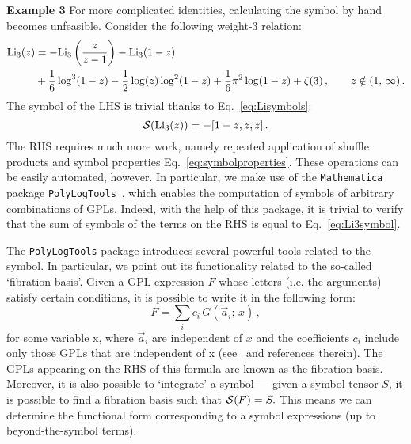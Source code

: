 \documentclass[main.tex]{subfiles}
\begin{document}
\textbf{Example 3}
\newline
{}
For more complicated identities, calculating the symbol by hand becomes unfeasible. Consider the following weight-3 relation:
\begin{align}
    \text{Li}_3(z)&=-\text{Li}_3\left(\frac{z}{z-1}\right)-\text{Li}_3(1-z) \nonumber \\
    &+\frac{1}{6} \log ^3(1-z)-\frac{1}{2} \log (z) \log ^2(1-z)+\frac{1}{6} \pi ^2 \log (1-z)+\zeta (3)\,, \qquad z \notin (1, \, \infty)\,.
\end{align}
The symbol of the LHS is trivial thanks to Eq.~\ref{eq:Lisymbols}:
\begin{equation} \label{eq:Li3symbol}
    \mathcal{S}(\text{Li}_3(z)) = -[1-z,z,z]\,.
\end{equation}
The RHS requires much more work, namely repeated application of shuffle products and symbol properties Eq.~\ref{eq:symbolproperties}. These operations can be easily automated, however. In particular, we make use of the \texttt{Mathematica} package \texttt{PolyLogTools}~\cite{Duhr:2019tlz}, which enables the computation of symbols of arbitrary combinations of GPLs. Indeed, with the help of this package, it is trivial to verify that the sum of symbols of the terms on the RHS is equal to Eq.~\ref{eq:Li3symbol}.

The \texttt{PolyLogTools} package introduces several powerful tools related to the symbol. In particular, we point out its functionality related to the so-called `fibration basis'. Given a GPL expression $F$ whose letters (i.e. the arguments) satisfy certain conditions, it is possible to write it in the following form:
\begin{equation}
    F = \sum_i c_i\, G(\vec{a}_i;\, x)\,,
\end{equation}
for some variable x, where $\vec{a}_i$ are independent of $x$ and the coefficients $c_i$ include only those GPLs that are independent of x (see~\cite{Duhr:2019tlz} and references therein). The GPLs appearing on the RHS of this formula are known as the fibration basis. Moreover, it is also possible to `integrate' a symbol --- given a symbol tensor $S$, it is possible to find a fibration basis such that $\mathcal{S}(F) = S.$  This means we can determine the functional form corresponding to a symbol expressions (up to beyond-the-symbol terms). 
\end{document}
